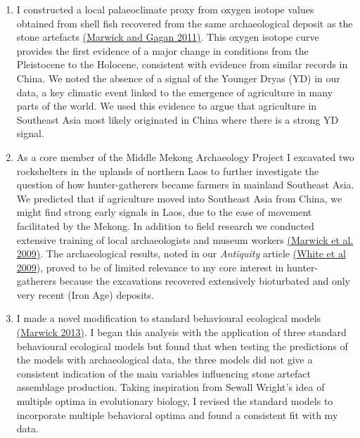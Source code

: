\documentclass[11pt,article,oneside]{memoir}
\begin{document}
\begin{enumerate}

\item  I constructed a local palaeoclimate proxy from oxygen isotope values obtained from shell fish recovered from the same archaeological deposit as the stone artefacts {\href{http://faculty.washington.edu/bmarwick/PDFs/Marwick_and_Gagan_2011_QSR.pdf}{(Marwick and Gagan 2011)}}. This oxygen isotope curve provides the first evidence of a major change in conditions from the Pleistocene to the Holocene,  consistent with evidence from similar records in China. We noted the absence of a signal of the Younger Dryas (YD) in our data, a key climatic event linked to the emergence of agriculture in many parts of the world. We used this evidence to argue that agriculture in Southeast Asia most likely originated in China where there is a strong YD signal.

\item As a core member of the Middle Mekong Archaeology Project I excavated two rockshelters in the uplands of northern Laos to further investigate the question of how hunter-gatherers became farmers in mainland Southeast Asia. We predicted that if agriculture moved into Southeast Asia from China, we might find strong early signals in Laos, due to the ease of movement facilitated by the Mekong. In addition to field research we conducted extensive training of local archaeologists and museum workers  {\href{http://faculty.washington.edu/bmarwick/PDFs/Marwick_et_al_2009_MMAP.pdf}{(Marwick et al. 2009)}}. The archaeological results, noted in our \textit{Antiquity} article {\href{http://antiquity.ac.uk/projgall/white/}{(White et al 2009})}, proved to be of limited relevance to my core interest in hunter-gatherers because the excavations recovered extensively bioturbated and only very recent (Iron Age) deposits. 

\item I made a novel modification to standard behavioural ecological models  {\href{http://faculty.washington.edu/bmarwick/PDFs/Marwick_2013_JAA.pdf}{(Marwick 2013)}}. I began this analysis with the application of three standard behavioural ecological models but found that when testing the predictions of the models with archaeological data, the three models did not give a consistent indication of the main variables influencing stone artefact assemblage production. Taking inspiration from Sewall Wright's  idea of multiple optima in evolutionary biology, I revised the standard models to incorporate multiple behavioral optima and found a consistent fit with my data. 

\end{enumerate}
\end{document}
